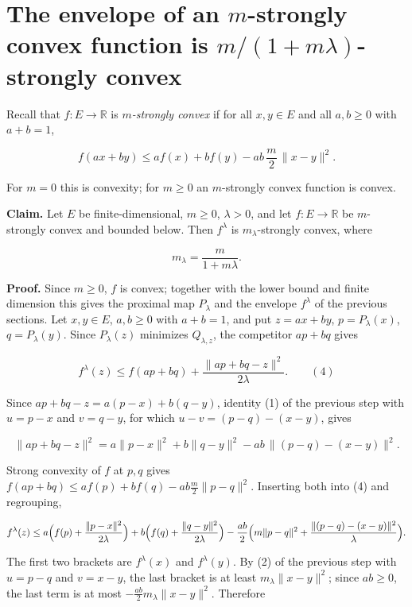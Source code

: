 \documentclass[11pt,a4paper]{article}
\begin{document}
\section{\texorpdfstring{The envelope of an \(m\)-strongly convex function is \(m/(1+m\lambda)\)-strongly convex}{The envelope of an m-strongly convex function is m/(1+mλ)-strongly convex}}


Recall that \(f:E\to\mathbb R\) is \emph{\(m\)-strongly convex} if for all \(x,y\in E\) and all \(a,b\ge0\) with \(a+b=1\),


\[f(ax+by)\le af(x)+bf(y)-ab\,\frac m2\,\|x-y\|^2.\]


For \(m=0\) this is convexity; for \(m\ge0\) an \(m\)-strongly convex function is convex.




\textbf{Claim.} Let \(E\) be finite-dimensional, \(m\ge0\), \(\lambda>0\), and let \(f:E\to\mathbb R\) be \(m\)-strongly convex and bounded below. Then \(f^\lambda\) is \(m_\lambda\)-strongly convex, where


\[m_\lambda=\frac{m}{1+m\lambda}.\]


\textbf{Proof.} Since \(m\ge0\), \(f\) is convex; together with the lower bound and finite dimension this gives the proximal map \(P_\lambda\) and the envelope \(f^\lambda\) of the previous sections. Let \(x,y\in E\), \(a,b\ge0\) with \(a+b=1\), and put \(z=ax+by\), \(p=P_\lambda(x)\), \(q=P_\lambda(y)\). Since \(P_\lambda(z)\) minimizes \(Q_{\lambda,z}\), the competitor \(ap+bq\) gives


\[f^\lambda(z)\le f(ap+bq)+\frac{\|ap+bq-z\|^2}{2\lambda}.\qquad(4)\]


Since \(ap+bq-z=a(p-x)+b(q-y)\), identity (1) of the previous step with \(u=p-x\) and \(v=q-y\), for which \(u-v=(p-q)-(x-y)\), gives


\[\|ap+bq-z\|^2=a\|p-x\|^2+b\|q-y\|^2-ab\,\|(p-q)-(x-y)\|^2.\]


Strong convexity of \(f\) at \(p,q\) gives \(f(ap+bq)\le af(p)+bf(q)-ab\frac m2\|p-q\|^2\). Inserting both into (4) and regrouping,


\[f^\lambda(z)\le a\Bigl(f(p)+\frac{\|p-x\|^2}{2\lambda}\Bigr)+b\Bigl(f(q)+\frac{\|q-y\|^2}{2\lambda}\Bigr)-\frac{ab}{2}\Bigl(m\|p-q\|^2+\frac{\|(p-q)-(x-y)\|^2}{\lambda}\Bigr).\]


The first two brackets are \(f^\lambda(x)\) and \(f^\lambda(y)\). By (2) of the previous step with \(u=p-q\) and \(v=x-y\), the last bracket is at least \(m_\lambda\|x-y\|^2\); since \(ab\ge0\), the last term is at most \(-\frac{ab}{2}m_\lambda\|x-y\|^2\). Therefore
\end{document}
